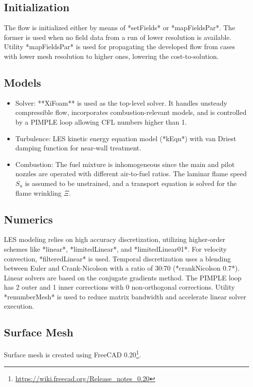 \subsection*{Initialization}
The flow is initialized either by means of *setFields* or *mapFieldsPar*. The former is used when no field data from a run of lower resolution is available. Utility *mapFieldsPar* is used for propagating the developed flow from cases with lower mesh resolution to higher ones, lowering the cost-to-solution.

\subsection*{Models}
\begin{itemize}
    \item Solver: **XiFoam** is used as the top-level solver. It handles unsteady compressible flow, incorporates combustion-relevant models, and is controlled by a PIMPLE loop allowing CFL numbers higher than 1.
    \item Turbulence: LES kinetic energy equation model (*kEqn*) with van Driest damping function for near-wall treatment.
    \item Combustion: The fuel mixture is inhomogeneous since the main and pilot nozzles are operated with different air-to-fuel ratios. The laminar flame speed $S_u$ is assumed to be unstrained, and a transport equation is solved for the flame wrinkling $\Xi$.
\end{itemize}

\subsection*{Numerics}
LES modeling relies on high accuracy discretization, utilizing higher-order schemes like *linear*, *limitedLinear*, and *limitedLinear01*. For velocity convection, *filteredLinear* is used. Temporal discretization uses a blending between Euler and Crank-Nicolson with a ratio of 30:70 (*crankNicolson 0.7*). Linear solvers are based on the conjugate gradients method. The PIMPLE loop has 2 outer and 1 inner corrections with 0 non-orthogonal corrections. Utility *renumberMesh* is used to reduce matrix bandwidth and accelerate linear solver execution.

\subsection*{Surface Mesh}
Surface mesh is created using FreeCAD 0.20\footnote{\url{https://wiki.freecad.org/Release_notes_0.20}}.

